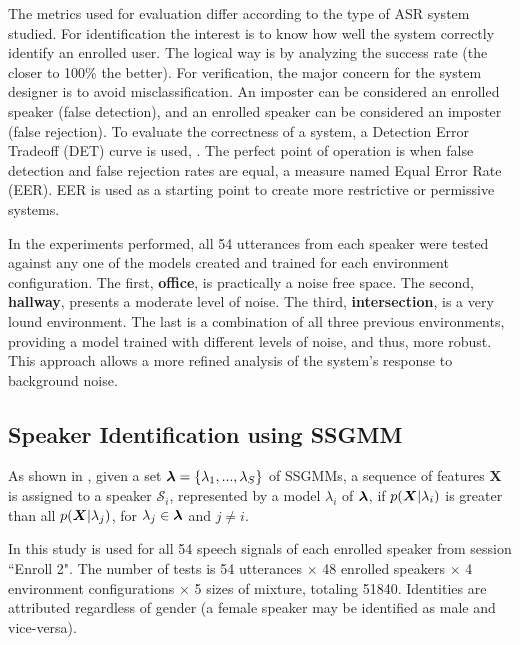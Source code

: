 The metrics used for evaluation differ according to the type of ASR system studied. For identification the interest is to know how well the system correctly identify an enrolled user. The logical way is by analyzing the success rate (the closer to 100\% the better). For verification, the major concern for the system designer is to avoid misclassification. An imposter can be considered an enrolled speaker (false detection), and an enrolled speaker can be considered an imposter (false rejection). To evaluate the correctness of a system, a Detection Error Tradeoff (DET) curve is used, . The perfect point of operation is when false detection and false rejection rates are equal, a measure named Equal Error Rate (EER). EER is used as a starting point to create more restrictive or permissive systems.

In the experiments performed, all 54 utterances from each speaker were tested against any one of the models created and trained for each environment configuration. The first, \textbf{office}, is practically a noise free space. The second, \textbf{hallway}, presents a moderate level of noise. The third, \textbf{intersection}, is a very lound environment. The last is a combination of all three previous environments, providing a model trained with different levels of noise, and thus, more robust. This approach allows a more refined analysis of the system's response to background noise.

\subsection{Speaker Identification using SSGMM}

As shown in , given a set $\boldsymbol{\lambda} = \{\lambda_1, ..., \lambda_S\}$ of SSGMMs, a sequence of features $\boldsymbol{X}$ is assigned to a speaker $\mathcal{S}_i$, represented by a model $\lambda_i$ of $\boldsymbol{\lambda}$, if $p(\boldsymbol{X}|\lambda_i)$ is greater than all $p(\boldsymbol{X}|\lambda_j)$, for $\lambda_j \in \boldsymbol{\lambda}$ and $j \ne i$.



In this study  is used for all 54 speech signals of each enrolled speaker from session ``Enroll 2". The number of tests is 54 utterances $\times$ 48 enrolled speakers $\times$ 4 environment configurations $\times$ 5 sizes of mixture, totaling 51840. Identities are attributed regardless of gender (a female speaker may be identified as male and vice-versa).

